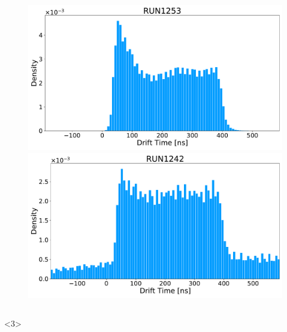 \documentclass{beamer}
\begin{document}
\begin{frame}
{\begin{columns}
\begin{column}{0.5\textwidth}
					\begin{figure}
						\centering 
						\includegraphics[width=1.0\textwidth]{./Images/1253_blue.pdf}
						\includegraphics[width=1.0\textwidth]{./Images/1242_blue.pdf}
					\end{figure}

			\end{column}
		\end{columns}
		}<3>

\end{frame}
\end{document}
